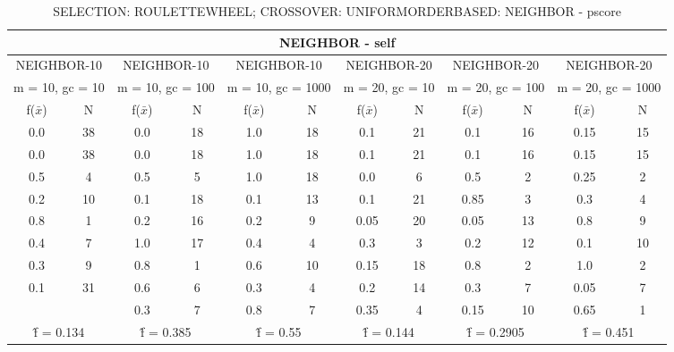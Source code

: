 \begin{table}[H]
	\centering
	\caption{SELECTION: ROULETTEWHEEL; CROSSOVER: UNIFORMORDERBASED: NEIGHBOR - pscore}
	\begin{adjustbox}{width=1\textwidth}
		\begin{tabular}{ |c|c||c|c||c|c||c|c||c|c||c|c| }
			\hline
			\multicolumn{12}{|c|}{NEIGHBOR - self} \\
			\hline
			\multicolumn{2}{|c||}{NEIGHBOR-10} & \multicolumn{2}{c||}{NEIGHBOR-10} & \multicolumn{2}{c||}{NEIGHBOR-10} & \multicolumn{2}{c||}{NEIGHBOR-20} & \multicolumn{2}{c||}{NEIGHBOR-20} & \multicolumn{2}{c|}{NEIGHBOR-20}\\
			\hline
			\multicolumn{2}{|c||}{m = 10, gc = 10} & \multicolumn{2}{c||}{m = 10, gc = 100} & \multicolumn{2}{c||}{m = 10, gc = 1000} & \multicolumn{2}{c||}{m = 20, gc = 10} & \multicolumn{2}{c||}{m = 20, gc = 100} & \multicolumn{2}{c|}{m = 20, gc = 1000}\\
			\hline
			f($\bar{x}$) & N & f($\bar{x}$) & N & f($\bar{x}$) & N & f($\bar{x}$) & N & f($\bar{x}$) & N & f($\bar{x}$) & N\\
			\hline
			\hline
			0.0 & 38 & 0.0 & 18 & 1.0 & 18 & 0.1 & 21 & 0.1 & 16 & 0.15 & 15\\
			\hline
			0.0 & 38 & 0.0 & 18 & 1.0 & 18 & 0.1 & 21 & 0.1 & 16 & 0.15 & 15\\
			0.5 & 4 & 0.5 & 5 & 1.0 & 18 & 0.0 & 6 & 0.5 & 2 & 0.25 & 2\\
			0.2 & 10 & 0.1 & 18 & 0.1 & 13 & 0.1 & 21 & 0.85 & 3 & 0.3 & 4\\
			0.8 & 1 & 0.2 & 16 & 0.2 & 9 & 0.05 & 20 & 0.05 & 13 & 0.8 & 9\\
			0.4 & 7 & 1.0 & 17 & 0.4 & 4 & 0.3 & 3 & 0.2 & 12 & 0.1 & 10\\
			0.3 & 9 & 0.8 & 1 & 0.6 & 10 & 0.15 & 18 & 0.8 & 2 & 1.0 & 2\\
			0.1 & 31 & 0.6 & 6 & 0.3 & 4 & 0.2 & 14 & 0.3 & 7 & 0.05 & 7\\
			&   & 0.3 & 7 & 0.8 & 7 & 0.35 & 4 & 0.15 & 10 & 0.65 & 1\\
			\hline
			\multicolumn{2}{|c||}{\^{f} = 0.134} & \multicolumn{2}{c||}{\^{f} = 0.385} & \multicolumn{2}{c||}{\^{f} = 0.55} & \multicolumn{2}{c||}{\^{f} = 0.144} & \multicolumn{2}{c||}{\^{f} = 0.2905} & \multicolumn{2}{c|}{\^{f} = 0.451}\\
			\hline
		\end{tabular}
	\end{adjustbox}
	\label{tab-5p-res3}
\end{table}
